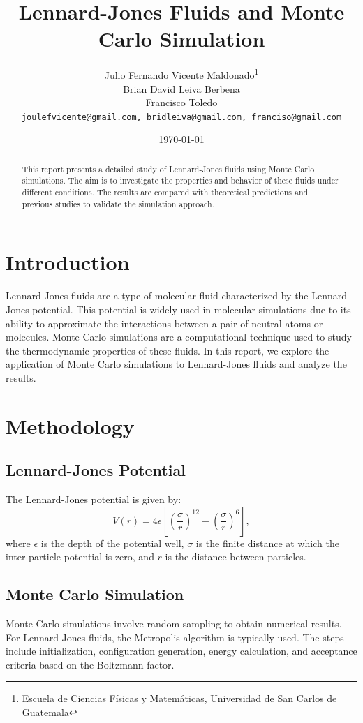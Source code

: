 \documentclass[a4paper,12pt]{article}
\title{Lennard-Jones Fluids and Monte Carlo Simulation}
\author{
    Julio Fernando Vicente Maldonado\thanks{Escuela de Ciencias Físicas y Matemáticas, Universidad de San Carlos de Guatemala} \\
     Brian David Leiva Berbena\footnotemark[1] \\
    Francisco Toledo\footnotemark[1] \\
    \texttt{joulefvicente@gmail.com, bridleiva@gmail.com, franciso@gmail.com}
}
\date{\today}
\begin{document}
\maketitle

\begin{abstract}
This report presents a detailed study of Lennard-Jones fluids using Monte Carlo simulations. The aim is to investigate the properties and behavior of these fluids under different conditions. The results are compared with theoretical predictions and previous studies to validate the simulation approach.
\end{abstract}

\section{Introduction}
Lennard-Jones fluids are a type of molecular fluid characterized by the Lennard-Jones potential. This potential is widely used in molecular simulations due to its ability to approximate the interactions between a pair of neutral atoms or molecules. Monte Carlo simulations are a computational technique used to study the thermodynamic properties of these fluids. In this report, we explore the application of Monte Carlo simulations to Lennard-Jones fluids and analyze the results.

\section{Methodology}
\subsection{Lennard-Jones Potential}
The Lennard-Jones potential is given by:
\begin{equation}
    V(r) = 4\epsilon \left[ \left( \frac{\sigma}{r} \right)^{12} - \left( \frac{\sigma}{r} \right)^{6} \right],
\end{equation}
where \( \epsilon \) is the depth of the potential well, \( \sigma \) is the finite distance at which the inter-particle potential is zero, and \( r \) is the distance between particles.

\subsection{Monte Carlo Simulation}
Monte Carlo simulations involve random sampling to obtain numerical results. For Lennard-Jones fluids, the Metropolis algorithm is typically used. The steps include initialization, configuration generation, energy calculation, and acceptance criteria based on the Boltzmann factor.
\end{document}
